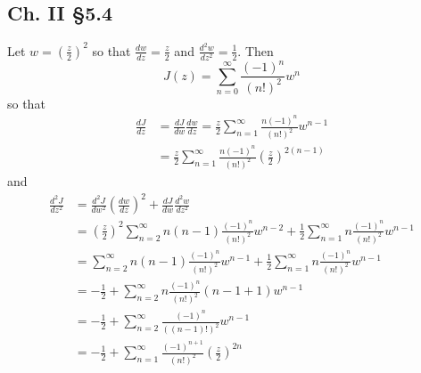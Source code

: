 \documentclass{article}
\begin{document}
\subsection*{Ch. II \S 5.4}
Let $w = \left(\frac{z}{2}\right)^2$ so that
$\frac{dw}{dz} = \frac{z}{2}$
and $\frac{d^2w}{dz^2} = \frac{1}{2}$.
Then
$$
J(z) = \sum_{n=0}^\infty \frac{(-1)^n}{(n!)^2} w^n
$$
so that
\begin{align*}
   \frac{dJ}{dz}
&= \frac{dJ}{dw}\frac{dw}{dz}
 = \frac{z}{2}\sum_{n=1}^\infty \frac{n (-1)^n}{(n!)^2} w^{n-1} \\
&= \frac{z}{2}
   \sum_{n=1}^\infty
     \frac{n (-1)^n}{(n!)^2}
     \left(\frac{z}{2}\right)^{2(n-1)}
\end{align*}
and
\begin{align*}
   \frac{d^2J}{dz^2}
&= \frac{d^2J}{dw^2}\left(\frac{dw}{dz}\right)^2
 + \frac{dJ}{dw}\frac{d^2w}{dz^2} \\
&= \left(\frac{z}{2}\right)^2
   \sum_{n=2}^\infty
     n (n-1)
     \frac{(-1)^n}{(n!)^2}
     w^{n-2}
  + \frac{1}{2}
    \sum_{n=1}^\infty
      n \frac{(-1)^n}{(n!)^2} w^{n-1} \\
&= \sum_{n=2}^\infty
     n (n-1)
     \frac{(-1)^n}{(n!)^2}
     w^{n-1}
  + \frac{1}{2}
    \sum_{n=1}^\infty
      n \frac{(-1)^n}{(n!)^2} w^{n-1} \\
&= -\frac{1}{2}
 +  \sum_{n=2}^\infty
      n \frac{(-1)^n}{(n!)^2}
      (n - 1 + 1) w^{n-1} \\
&= -\frac{1}{2}
 + \sum_{n=2}^\infty
   \frac{(-1)^n}{((n-1)!)^2} w^{n-1} \\
&= -\frac{1}{2}
 + \sum_{n=1}^\infty
     \frac{(-1)^{n+1}}{(n!)^2}
     \left(\frac{z}{2}\right)^{2n}
\end{align*}
\end{document}
